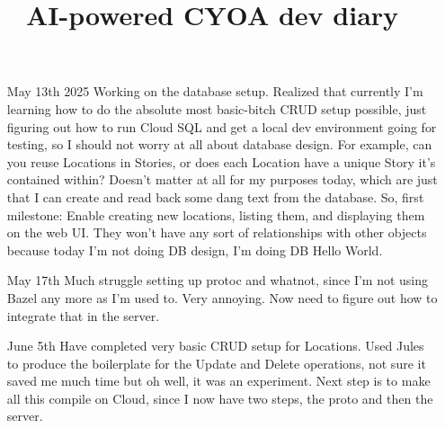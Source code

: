 \documentclass[12pt]{article}
\title{AI-powered CYOA dev diary}
\begin{document}
\begin{itemize}
\item[May 13th 2025] Working on the database setup. Realized that
  currently I'm learning how to do the absolute most basic-bitch CRUD
  setup possible, just figuring out how to run Cloud SQL and get a
  local dev environment going for testing, so I should not worry at
  all about database design. For example, can you reuse Locations in
  Stories, or does each Location have a unique Story it's contained
  within? Doesn't matter at all for my purposes today, which are just
  that I can create and read back some dang text from the
  database. So, first milestone: Enable creating new locations,
  listing them, and displaying them on the web UI. They won't have any
  sort of relationships with other objects because today I'm not doing
  DB design, I'm doing DB Hello World.
\item[May 17th] Much struggle setting up protoc and whatnot, since I'm
  not using Bazel any more as I'm used to. Very annoying. Now need to
  figure out how to integrate that in the server.
\item[June 5th] Have completed very basic CRUD setup for
  Locations. Used Jules to produce the boilerplate for the Update and
  Delete operations, not sure it saved me much time but oh well, it
  was an experiment. Next step is to make all this compile on Cloud,
  since I now have two steps, the proto and then the server.
\end{itemize}
\end{document}
